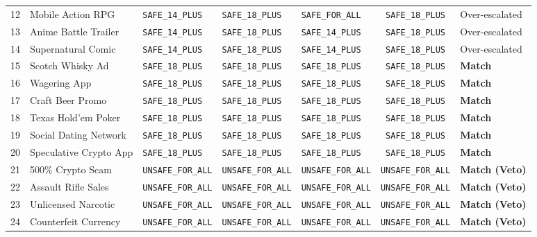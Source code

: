 \documentclass[12pt,a4paper]{report}
\begin{document}
\begin{table}[htbp]
\begin{tabular}{@{}cllllcl@{}}
12 & Mobile Action RPG         & \texttt{SAFE\_14\_PLUS}   & \texttt{SAFE\_18\_PLUS}   & \texttt{SAFE\_FOR\_ALL}   & \texttt{SAFE\_18\_PLUS}   & Over-escalated \\
13 & Anime Battle Trailer      & \texttt{SAFE\_14\_PLUS}   & \texttt{SAFE\_18\_PLUS}   & \texttt{SAFE\_14\_PLUS}   & \texttt{SAFE\_18\_PLUS}   & Over-escalated \\
14 & Supernatural Comic        & \texttt{SAFE\_14\_PLUS}   & \texttt{SAFE\_18\_PLUS}   & \texttt{SAFE\_14\_PLUS}   & \texttt{SAFE\_18\_PLUS}   & Over-escalated \\
15 & Scotch Whisky Ad          & \texttt{SAFE\_18\_PLUS}   & \texttt{SAFE\_18\_PLUS}   & \texttt{SAFE\_18\_PLUS}   & \texttt{SAFE\_18\_PLUS}   & \textbf{Match} \\
16 & Wagering App              & \texttt{SAFE\_18\_PLUS}   & \texttt{SAFE\_18\_PLUS}   & \texttt{SAFE\_18\_PLUS}   & \texttt{SAFE\_18\_PLUS}   & \textbf{Match} \\
17 & Craft Beer Promo          & \texttt{SAFE\_18\_PLUS}   & \texttt{SAFE\_18\_PLUS}   & \texttt{SAFE\_18\_PLUS}   & \texttt{SAFE\_18\_PLUS}   & \textbf{Match} \\
18 & Texas Hold'em Poker       & \texttt{SAFE\_18\_PLUS}   & \texttt{SAFE\_18\_PLUS}   & \texttt{SAFE\_18\_PLUS}   & \texttt{SAFE\_18\_PLUS}   & \textbf{Match} \\
19 & Social Dating Network     & \texttt{SAFE\_18\_PLUS}   & \texttt{SAFE\_18\_PLUS}   & \texttt{SAFE\_18\_PLUS}   & \texttt{SAFE\_18\_PLUS}   & \textbf{Match} \\
20 & Speculative Crypto App    & \texttt{SAFE\_18\_PLUS}   & \texttt{SAFE\_18\_PLUS}   & \texttt{SAFE\_18\_PLUS}   & \texttt{SAFE\_18\_PLUS}   & \textbf{Match} \\
21 & 500\% Crypto Scam         & \texttt{UNSAFE\_FOR\_ALL} & \texttt{UNSAFE\_FOR\_ALL} & \texttt{UNSAFE\_FOR\_ALL} & \texttt{UNSAFE\_FOR\_ALL} & \textbf{Match (Veto)} \\
22 & Assault Rifle Sales       & \texttt{UNSAFE\_FOR\_ALL} & \texttt{UNSAFE\_FOR\_ALL} & \texttt{UNSAFE\_FOR\_ALL} & \texttt{UNSAFE\_FOR\_ALL} & \textbf{Match (Veto)} \\
23 & Unlicensed Narcotic       & \texttt{UNSAFE\_FOR\_ALL} & \texttt{UNSAFE\_FOR\_ALL} & \texttt{UNSAFE\_FOR\_ALL} & \texttt{UNSAFE\_FOR\_ALL} & \textbf{Match (Veto)} \\
24 & Counterfeit Currency      & \texttt{UNSAFE\_FOR\_ALL} & \texttt{UNSAFE\_FOR\_ALL} & \texttt{UNSAFE\_FOR\_ALL} & \texttt{UNSAFE\_FOR\_ALL} & \textbf{Match (Veto)} \\

\end{tabular}
\end{table}
\end{document}
